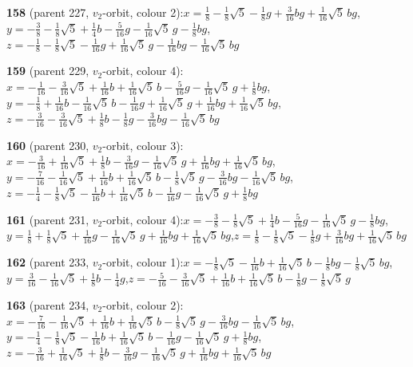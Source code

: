 \documentclass[10pt]{article}
\begin{document}
{\noindent\textbf{158} (parent 227, $v_2$-orbit, colour 2):\quad $x=\tfrac{1}{8}-\tfrac{1}{8}\sqrt5-\tfrac{1}{8}g+\tfrac{3}{16}bg+\tfrac{1}{16}\sqrt5\,bg$,\quad $y=-\tfrac{3}{8}-\tfrac{1}{8}\sqrt5+\tfrac{1}{4}b-\tfrac{5}{16}g-\tfrac{1}{16}\sqrt5\,g-\tfrac{1}{8}bg$,\quad $z=-\tfrac{1}{8}-\tfrac{1}{8}\sqrt5-\tfrac{1}{16}g+\tfrac{1}{16}\sqrt5\,g-\tfrac{1}{16}bg-\tfrac{1}{16}\sqrt5\,bg$\par\smallskip
\noindent\textbf{159} (parent 229, $v_2$-orbit, colour 4):\quad $x=-\tfrac{1}{16}-\tfrac{3}{16}\sqrt5+\tfrac{1}{16}b+\tfrac{1}{16}\sqrt5\,b-\tfrac{5}{16}g-\tfrac{1}{16}\sqrt5\,g+\tfrac{1}{8}bg$,\quad $y=-\tfrac{1}{8}+\tfrac{1}{16}b-\tfrac{1}{16}\sqrt5\,b-\tfrac{1}{16}g+\tfrac{1}{16}\sqrt5\,g+\tfrac{1}{16}bg+\tfrac{1}{16}\sqrt5\,bg$,\quad $z=-\tfrac{3}{16}-\tfrac{3}{16}\sqrt5+\tfrac{1}{8}b-\tfrac{1}{8}g-\tfrac{3}{16}bg-\tfrac{1}{16}\sqrt5\,bg$\par\smallskip
\noindent\textbf{160} (parent 230, $v_2$-orbit, colour 3):\quad $x=-\tfrac{3}{16}+\tfrac{1}{16}\sqrt5+\tfrac{1}{8}b-\tfrac{3}{16}g-\tfrac{1}{16}\sqrt5\,g+\tfrac{1}{16}bg+\tfrac{1}{16}\sqrt5\,bg$,\quad $y=-\tfrac{7}{16}-\tfrac{1}{16}\sqrt5+\tfrac{1}{16}b+\tfrac{1}{16}\sqrt5\,b-\tfrac{1}{8}\sqrt5\,g-\tfrac{3}{16}bg-\tfrac{1}{16}\sqrt5\,bg$,\quad $z=-\tfrac{1}{4}-\tfrac{1}{8}\sqrt5-\tfrac{1}{16}b+\tfrac{1}{16}\sqrt5\,b-\tfrac{1}{16}g-\tfrac{1}{16}\sqrt5\,g+\tfrac{1}{8}bg$\par\smallskip
\noindent\textbf{161} (parent 231, $v_2$-orbit, colour 4):\quad $x=-\tfrac{3}{8}-\tfrac{1}{8}\sqrt5+\tfrac{1}{4}b-\tfrac{5}{16}g-\tfrac{1}{16}\sqrt5\,g-\tfrac{1}{8}bg$,\quad $y=\tfrac{1}{8}+\tfrac{1}{8}\sqrt5+\tfrac{1}{16}g-\tfrac{1}{16}\sqrt5\,g+\tfrac{1}{16}bg+\tfrac{1}{16}\sqrt5\,bg$,\quad $z=\tfrac{1}{8}-\tfrac{1}{8}\sqrt5-\tfrac{1}{8}g+\tfrac{3}{16}bg+\tfrac{1}{16}\sqrt5\,bg$\par\smallskip
\noindent\textbf{162} (parent 233, $v_2$-orbit, colour 1):\quad $x=-\tfrac{1}{8}\sqrt5-\tfrac{1}{16}b+\tfrac{1}{16}\sqrt5\,b-\tfrac{1}{8}bg-\tfrac{1}{8}\sqrt5\,bg$,\quad $y=\tfrac{3}{16}-\tfrac{1}{16}\sqrt5+\tfrac{1}{8}b-\tfrac{1}{4}g$,\quad $z=-\tfrac{5}{16}-\tfrac{3}{16}\sqrt5+\tfrac{1}{16}b+\tfrac{1}{16}\sqrt5\,b-\tfrac{1}{8}g-\tfrac{1}{8}\sqrt5\,g$\par\smallskip
\noindent\textbf{163} (parent 234, $v_2$-orbit, colour 2):\quad $x=-\tfrac{7}{16}-\tfrac{1}{16}\sqrt5+\tfrac{1}{16}b+\tfrac{1}{16}\sqrt5\,b-\tfrac{1}{8}\sqrt5\,g-\tfrac{3}{16}bg-\tfrac{1}{16}\sqrt5\,bg$,\quad $y=-\tfrac{1}{4}-\tfrac{1}{8}\sqrt5-\tfrac{1}{16}b+\tfrac{1}{16}\sqrt5\,b-\tfrac{1}{16}g-\tfrac{1}{16}\sqrt5\,g+\tfrac{1}{8}bg$,\quad $z=-\tfrac{3}{16}+\tfrac{1}{16}\sqrt5+\tfrac{1}{8}b-\tfrac{3}{16}g-\tfrac{1}{16}\sqrt5\,g+\tfrac{1}{16}bg+\tfrac{1}{16}\sqrt5\,bg$\par\smallskip
}
\end{document}
